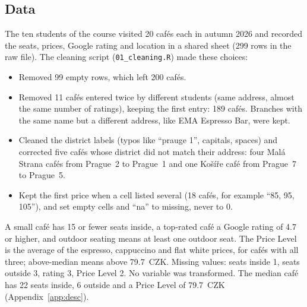 \documentclass[11pt,a4paper]{article}
\begin{document}
\subsection{Data}
The ten students of the course visited 20 caf\'es each in autumn 2026 and recorded the seats, prices, Google rating and location in a shared sheet (299 rows in the raw file). The cleaning script (\texttt{01\_cleaning.R}) made these choices:
\begin{itemize}
  \item Removed 99 empty rows, which left 200 caf\'es.
  \item Removed 11 caf\'es entered twice by different students (same address, almost the same number of ratings), keeping the first entry: 189 caf\'es. Branches with the same name but a different address, like EMA Espresso Bar, were kept.
  \item Cleaned the district labels (typos like ``prauge 1'', capitals, spaces) and corrected five caf\'es whose district did not match their address: four Mal\'a Strana caf\'es from Prague~2 to Prague~1 and one Ko\v{s}\'i\v{r}e caf\'e from Prague~7 to Prague~5.
  \item Kept the first price when a cell listed several (18 caf\'es, for example ``85, 95, 105''), and set empty cells and ``na'' to missing, never to 0.
\end{itemize}
A small caf\'e has 15 or fewer seats inside, a top-rated caf\'e a Google rating of 4.7 or higher, and outdoor seating means at least one outdoor seat. The Price Level is the average of the espresso, cappuccino and flat white prices, for caf\'es with all three; above-median means above 79.7~CZK. Missing values: seats inside 1, seats outside 3, rating 3, Price Level 2. No variable was transformed. The median caf\'e has 22 seats inside, 6 outside and a Price Level of 79.7~CZK (Appendix~\ref{app:desc}).

\FloatBarrier
\end{document}
